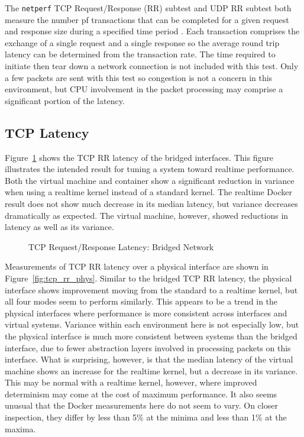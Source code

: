 The \texttt{netperf} TCP Request/Response (RR) subtest and UDP RR subtest both measure the number pf transactions that can be completed for a given request and response size during a specified time period \autocite{netperfTraining}.
Each transaction comprises the exchange of a single request and a single response so the average round trip latency can be determined from the transaction rate.  
The time required to initiate then tear down a network connection is not included with this test.  
Only a few packets are sent with this test so congestion is not a concern in this environment, but CPU involvement in the packet processing may comprise a significant portion of the latency.  

\subsection{TCP Latency} %
\label{sub:tcplatency}
Figure~\ref{fig:tcp_rr_bridge} shows the TCP RR latency of the bridged interfaces.
This figure illustrates the intended result for tuning a system toward realtime performance.
Both the virtual machine and container show a significant reduction in variance when using a realtime kernel instead of a standard kernel.
The realtime Docker result does not show much decrease in its median latency, but variance decreases dramatically as expected.
The virtual machine, however, showed reductions in latency as well as its variance.

\begin{figure}
    \centering
    \def\svgwidth{\columnwidth}
    
    \caption{TCP Request/Response Latency: Bridged Network}
    \label{fig:tcp_rr_bridge}
\end{figure}

Measurements of TCP RR latency over a physical interface are shown in Figure~\ref{fig:tcp_rr_phys}.  
Similar to the bridged TCP RR latency, the physical interface shows improvement moving from the standard to a realtime kernel, but all four modes seem to perform similarly.
This appears to be a trend in the physical interfaces where performance is more consistent across interfaces and virtual systems.
Variance within each environment here is not especially low, but the physical interface is much more consistent between systems than the bridged interface, due to fewer abstraction layers involved in processing packets on this interface. 
What is surprising, however, is that the median latency of the virtual machine shows an increase for the realtime kernel, but a decrease in its variance.  
This may be normal with a realtime kernel, however, where improved determinism may come at the cost of maximum performance.  
It also seems unusual that the Docker measurements here do not seem to vary.  
On closer inspection, they differ by less than 5\% at the minima and less than 1\% at the maxima.

